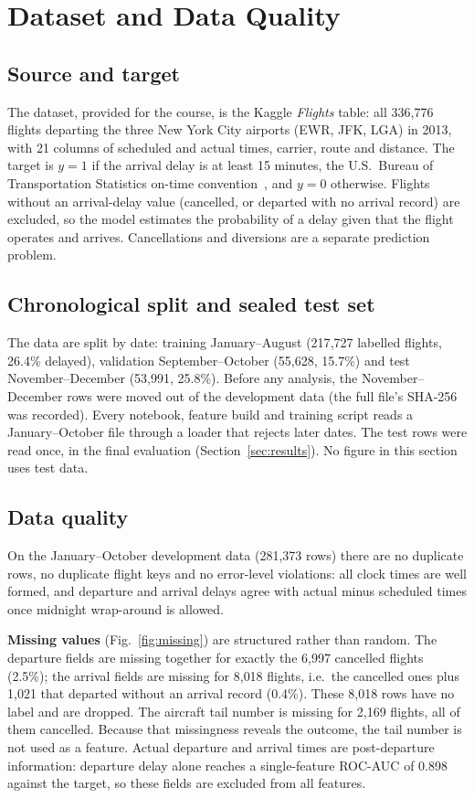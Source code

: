 \section{Dataset and Data Quality}
\label{sec:data}

\subsection{Source and target}
The dataset, provided for the course, is the Kaggle \emph{Flights} table: all 336{,}776 flights
departing the three New York City airports (EWR, JFK, LGA) in 2013, with 21 columns of scheduled
and actual times, carrier, route and distance. The target is $y = 1$ if the arrival delay is at
least 15 minutes, the U.S.\ Bureau of Transportation Statistics on-time convention~\cite{bts_ontime},
and $y = 0$ otherwise. Flights without an arrival-delay value (cancelled, or departed with no
arrival record) are excluded, so the model estimates the probability of a delay given that the
flight operates and arrives. Cancellations and diversions are a separate prediction problem.

\subsection{Chronological split and sealed test set}
The data are split by date: training January--August (217{,}727 labelled flights, 26.4\%
delayed), validation September--October (55{,}628, 15.7\%) and test November--December (53{,}991,
25.8\%). Before any analysis, the November--December rows were moved out of the development data
(the full file's SHA-256 was recorded). Every notebook, feature build and training script reads a
January--October file through a loader that rejects later dates. The test rows were read once, in
the final evaluation (Section~\ref{sec:results}). No figure in this section uses test data.

\subsection{Data quality}
On the January--October development data (281{,}373 rows) there are no duplicate rows, no
duplicate flight keys and no error-level violations: all clock times are well formed, and
departure and arrival delays agree with actual minus scheduled times once midnight wrap-around is
allowed.

\textbf{Missing values} (Fig.~\ref{fig:missing}) are structured rather than random. The
departure fields are missing together for exactly the 6{,}997 cancelled flights (2.5\%); the
arrival fields are missing for 8{,}018 flights, i.e.\ the cancelled ones plus 1{,}021 that departed
without an arrival record (0.4\%). These 8{,}018 rows have no label and are dropped. The aircraft
tail number is missing for 2{,}169 flights, all of them cancelled. Because that missingness reveals
the outcome, the tail number is not used as a feature. Actual departure and arrival times are
post-departure information: departure delay alone reaches a single-feature ROC-AUC of 0.898
against the target, so these fields are excluded from all features.

